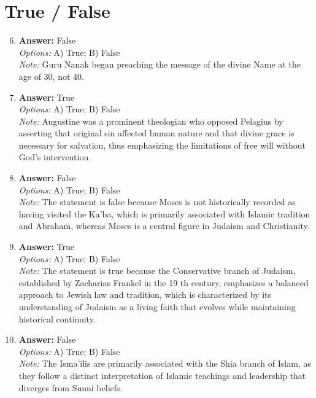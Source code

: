 \documentclass[12pt]{article}
\begin{document}
\section*{True / False}
\begin{enumerate}[label=\arabic*.]
\setcounter{enumi}{5}
\item \textbf{Answer:} False
\\ \textit{Options:} A) True; B) False
\\ \textit{Note:} Guru Nanak began preaching the message of the divine Name at the age of 30, not 40.
\item \textbf{Answer:} True
\\ \textit{Options:} A) True; B) False
\\ \textit{Note:} Augustine was a prominent theologian who opposed Pelagius by asserting that original sin affected human nature and that divine grace is necessary for salvation, thus emphasizing the limitations of free will without God's intervention.
\item \textbf{Answer:} False
\\ \textit{Options:} A) True; B) False
\\ \textit{Note:} The statement is false because Moses is not historically recorded as having visited the Ka'ba, which is primarily associated with Islamic tradition and Abraham, whereas Moses is a central figure in Judaism and Christianity.
\item \textbf{Answer:} True
\\ \textit{Options:} A) True; B) False
\\ \textit{Note:} The statement is true because the Conservative branch of Judaism, established by Zacharias Frankel in the 19 th century, emphasizes a balanced approach to Jewish law and tradition, which is characterized by its understanding of Judaism as a living faith that evolves while maintaining historical continuity.
\item \textbf{Answer:} False
\\ \textit{Options:} A) True; B) False
\\ \textit{Note:} The Isma'ilis are primarily associated with the Shia branch of Islam, as they follow a distinct interpretation of Islamic teachings and leadership that diverges from Sunni beliefs.
\end{enumerate}
\end{document}
